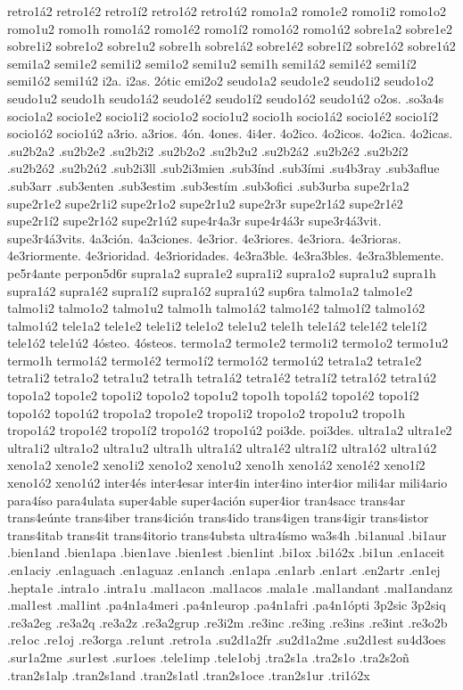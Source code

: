 {retro1^^e12 retro1^^e92 retro1^^ed2 retro1^^f32 retro1^^fa2
romo1a2 romo1e2 romo1i2 romo1o2 romo1u2 romo1h
romo1^^e12 romo1^^e92 romo1^^ed2 romo1^^f32 romo1^^fa2
sobre1a2 sobre1e2 sobre1i2 sobre1o2 sobre1u2 sobre1h
sobre1^^e12 sobre1^^e92 sobre1^^ed2 sobre1^^f32 sobre1^^fa2
semi1a2 semi1e2 semi1i2 semi1o2 semi1u2 semi1h
semi1^^e12 semi1^^e92 semi1^^ed2 semi1^^f32 semi1^^fa2
i2a. i2as.
2^^f3tic emi2o2
seudo1a2 seudo1e2 seudo1i2 seudo1o2 seudo1u2 seudo1h
seudo1^^e12 seudo1^^e92 seudo1^^ed2 seudo1^^f32 seudo1^^fa2
o2os.
.so3a4s
socio1a2 socio1e2 socio1i2 socio1o2 socio1u2 socio1h
socio1^^e12 socio1^^e92 socio1^^ed2 socio1^^f32 socio1^^fa2
a3rio. a3rios.
4^^f3n. 4ones.
4i4er.
4o2ico. 4o2icos. 4o2ica. 4o2icas.
.su2b2a2 .su2b2e2 .su2b2i2 .su2b2o2 .su2b2u2
.su2b2^^e12 .su2b2^^e92 .su2b2^^ed2 .su2b2^^f32 .su2b2^^fa2
.sub2i3ll
.sub2i3mien
.sub3^^ednd
.sub3^^edmi
.su4b3ray
.sub3aflue
.sub3arr
.sub3enten
.sub3estim .sub3est^^edm
.sub3ofici
.sub3urba
supe2r1a2 supe2r1e2 supe2r1i2 supe2r1o2 supe2r1u2 supe2r3r
supe2r1^^e12 supe2r1^^e92 supe2r1^^ed2 supe2r1^^f32 supe2r1^^fa2
supe4r4a3r supe4r4^^e13r
supe3r4^^e13vit. supe3r4^^e13vits.
4a3ci^^f3n. 4a3ciones.
4e3rior. 4e3riores. 4e3riora. 4e3rioras. 4e3riormente.
4e3rioridad. 4e3rioridades.
4e3ra3ble. 4e3ra3bles. 4e3ra3blemente.
pe5r4ante
perpon5d6r
supra1a2 supra1e2 supra1i2 supra1o2 supra1u2 supra1h
supra1^^e12 supra1^^e92 supra1^^ed2 supra1^^f32 supra1^^fa2
sup6ra
talmo1a2 talmo1e2 talmo1i2 talmo1o2 talmo1u2 talmo1h
talmo1^^e12 talmo1^^e92 talmo1^^ed2 talmo1^^f32 talmo1^^fa2
tele1a2 tele1e2 tele1i2 tele1o2 tele1u2 tele1h
tele1^^e12 tele1^^e92 tele1^^ed2 tele1^^f32 tele1^^fa2
4^^f3steo. 4^^f3steos.
termo1a2 termo1e2 termo1i2 termo1o2 termo1u2 termo1h
termo1^^e12 termo1^^e92 termo1^^ed2 termo1^^f32 termo1^^fa2
tetra1a2 tetra1e2 tetra1i2 tetra1o2 tetra1u2 tetra1h
tetra1^^e12 tetra1^^e92 tetra1^^ed2 tetra1^^f32 tetra1^^fa2
topo1a2 topo1e2 topo1i2 topo1o2 topo1u2 topo1h
topo1^^e12 topo1^^e92 topo1^^ed2 topo1^^f32 topo1^^fa2
tropo1a2 tropo1e2 tropo1i2 tropo1o2 tropo1u2 tropo1h
tropo1^^e12 tropo1^^e92 tropo1^^ed2 tropo1^^f32 tropo1^^fa2
poi3de. poi3des.
ultra1a2 ultra1e2 ultra1i2 ultra1o2 ultra1u2 ultra1h
ultra1^^e12 ultra1^^e92 ultra1^^ed2 ultra1^^f32 ultra1^^fa2
xeno1a2 xeno1e2 xeno1i2 xeno1o2 xeno1u2 xeno1h
xeno1^^e12 xeno1^^e92 xeno1^^ed2 xeno1^^f32 xeno1^^fa2
inter4^^e9s
inter4esar
inter4in
inter4ino
inter4ior
mili4ar
mili4ario
para4^^edso
para4ulata
super4able
super4aci^^f3n
super4ior
tran4sacc
trans4ar
trans4e^^fante
trans4iber
trans4ici^^f3n
trans4ido
trans4igen
trans4igir
trans4istor
trans4itab
trans4it
trans4itorio
trans4ubsta
ultra4^^edsmo
wa3s4h
.bi1anual
.bi1aur
.bien1and
.bien1apa
.bien1ave
.bien1est
.bien1int
.bi1ox
.bi1^^f32x
.bi1un
.en1aceit
.en1aciy
.en1aguach
.en1aguaz
.en1anch
.en1apa
.en1arb
.en1art
.en2artr
.en1ej
.hepta1e
.intra1o
.intra1u
.mal1acon
.mal1acos
.mala1e
.mal1andant
.mal1andanz
.mal1est
.mal1int
.pa4n1a4meri
.pa4n1europ
.pa4n1afri
.pa4n1^^f3pti
3p2sic
3p2siq
.re3a2eg
.re3a2q
.re3a2z
.re3a2grup
.re3i2m
.re3inc
.re3ing
.re3ins
.re3int
.re3o2b
.re1oc
.re1oj
.re3orga
.re1unt
.retro1a
.su2d1a2fr
.su2d1a2me
.su2d1est
su4d3oes
.sur1a2me
.sur1est
.sur1oes
.tele1imp
.tele1obj
.tra2s1a
.tra2s1o
.tra2s2o^^f1
.tran2s1alp
.tran2s1and
.tran2s1atl
.tran2s1oce
.tran2s1ur
.tri1^^f32x
}
